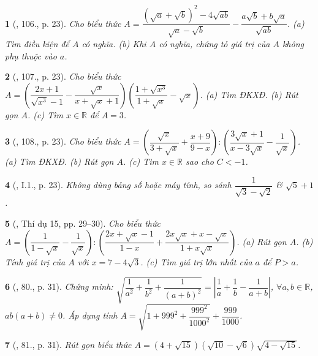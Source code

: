 \documentclass{article}
\newtheorem{baitoan}{}
\begin{document}
\begin{baitoan}[\cite{SBT_Toan_9_tap_1}, 106., p. 23]
	Cho biểu thức $A = \dfrac{(\sqrt{a} + \sqrt{b})^2 - 4\sqrt{ab}}{\sqrt{a} - \sqrt{b}} - \dfrac{a\sqrt{b} + b\sqrt{a}}{\sqrt{ab}}$. (a) Tìm điều kiện để $A$ có nghĩa. (b) Khi $A$ có nghĩa, chứng tỏ giá trị của $A$ không phụ thuộc vào $a$.
\end{baitoan}

\begin{baitoan}[\cite{SBT_Toan_9_tap_1}, 107., p. 23]
	Cho biểu thức $A = \left(\dfrac{2x + 1}{\sqrt{x^3} - 1} - \dfrac{\sqrt{x}}{x + \sqrt{x} + 1}\right)\left(\dfrac{1 + \sqrt{x^3}}{1 + \sqrt{x}} - \sqrt{x}\right)$. (a) Tìm ĐKXĐ. (b) Rút gọn $A$. (c) Tìm $x\in\mathbb{R}$ để $A = 3$.
\end{baitoan}

\begin{baitoan}[\cite{SBT_Toan_9_tap_1}, 108., p. 23]
	Cho biểu thức $A = \left(\dfrac{\sqrt{x}}{3 + \sqrt{x}} + \dfrac{x + 9}{9 - x}\right):\left(\dfrac{3\sqrt{x} + 1}{x - 3\sqrt{x}} - \dfrac{1}{\sqrt{x}}\right)$. (a) Tìm ĐKXĐ. (b) Rút gọn $A$. (c) Tìm $x\in\mathbb{R}$ sao cho $C < -1$.
\end{baitoan}

\begin{baitoan}[\cite{SBT_Toan_9_tap_1}, I.1., p. 23]
	Không dùng bảng số hoặc máy tính, so sánh $\dfrac{1}{\sqrt{3} - \sqrt{2}}$ \& $\sqrt{5} + 1$.
\end{baitoan}

\begin{baitoan}[\cite{Tuyen_Toan_9_old}, Thí dụ 15, pp. 29--30]
	Cho biểu thức $A = \left(\dfrac{1}{1 - \sqrt{x}} - \dfrac{1}{\sqrt{x}}\right):\left(\dfrac{2x + \sqrt{x} - 1}{1 - x} + \dfrac{2x\sqrt{x} + x - \sqrt{x}}{1 + x\sqrt{x}}\right)$. (a) Rút gọn $A$. (b) Tính giá trị của $A$ với $x = 7 - 4\sqrt{3}$. (c) Tìm giá trị lớn nhất của $a$ để $P > a$.
\end{baitoan}

\begin{baitoan}[\cite{Tuyen_Toan_9_old}, 80., p. 31]
	Chứng minh: $\sqrt{\dfrac{1}{a^2} + \dfrac{1}{b^2} + \dfrac{1}{(a + b)^2}} = \left|\dfrac{1}{a} + \dfrac{1}{b} - \dfrac{1}{a + b}\right|$, $\forall a,b\in\mathbb{R}$, $ab(a + b)\ne0$. Áp dụng tính $A = \sqrt{1 + 999^2 + \dfrac{999^2}{1000^2}} + \dfrac{999}{1000}$.
\end{baitoan}

\begin{baitoan}[\cite{Tuyen_Toan_9_old}, 81., p. 31]
	Rút gọn biểu thức $A = (4 + \sqrt{15})(\sqrt{10} - \sqrt{6})\sqrt{4 - \sqrt{15}}$.
\end{baitoan}
\end{document}
